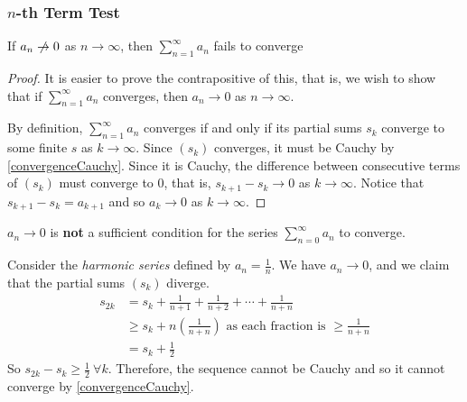 \documentclass[../main.tex]{subfiles}
\begin{document}
\subsubsection{$n$-th Term Test}
\begin{proposition}
  If $a_n \centernot\to 0$ as $n \to \infty$, then  $\sum_{n = 1}^{\infty} a_n$ fails to converge
  \label{nthTermTest}
\end{proposition}
\begin{proof}
  It is easier to prove the contrapositive of this, that is, we wish to show that if $\sum_{n = 1}^{\infty} a_n$ converges, then $a_n \to 0$ as $n \to \infty$.

  By definition, $\sum_{n = 1}^{\infty} a_n$ converges if and only if its partial sums $s_k$ converge to some finite $s$ as $k \to \infty$.
  Since $(s_k)$ converges, it must be Cauchy by \cref{convergenceCauchy}.
  Since it is Cauchy, the difference between consecutive terms of $(s_k)$ must converge to 0, that is, $s_{k + 1} - s_k \to 0$ as $k \to \infty$.
  Notice that $s_{k + 1} - s_k = a_{k + 1}$ and so $a_k \to 0$ as $k \to \infty$.
\end{proof}
\begin{remark}
  $a_n \to 0$ is \textbf{not} a sufficient condition for the series $\sum_{n=0}^{\infty} a_n$ to converge.

  Consider the \textit{harmonic series} defined by $a_n = \frac{1}{n}$.
  We have $a_n \to 0$, and we claim that the partial sums $(s_k)$ diverge.
  \begin{align*}
    s_{2k} &= s_k + \frac{1}{n + 1} + \frac{1}{n + 2} + \cdots + \frac{1}{n + n} \\
           &\geq s_k + n\left(\frac{1}{n + n}\right) \text{ as each fraction is $\geq \frac{1}{n + n}$}\\
           &= s_k + \frac{1}{2}
  \end{align*}
  So $s_{2k} - s_k \geq \frac{1}{2}\ \forall k$.
  Therefore, the sequence cannot be Cauchy and so it cannot converge by \cref{convergenceCauchy}.
\end{remark}
\end{document}
